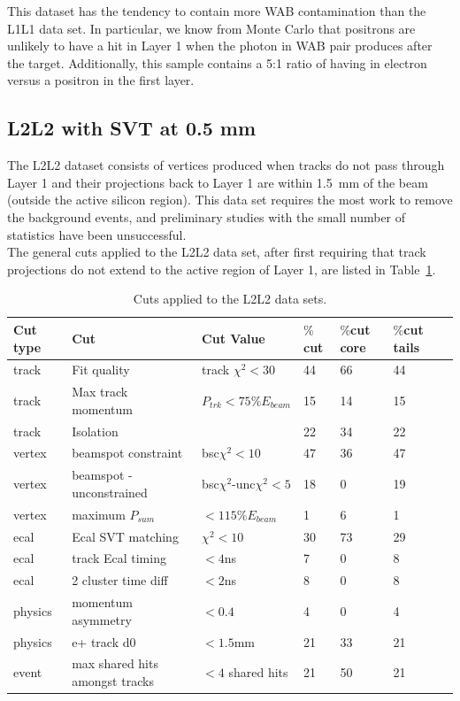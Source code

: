 This dataset has the tendency to contain more WAB contamination than the L1L1 data set. In particular, we know from Monte Carlo that positrons are unlikely to have a hit in Layer 1 when the photon in WAB pair produces after the target. Additionally, this sample contains a 5:1 ratio of having in electron versus a positron in the first layer. 

\subsection{L2L2 with SVT at 0.5 mm}

The L2L2 dataset consists of vertices produced when tracks do not pass through Layer 1 and their projections back to Layer 1 are within 1.5~mm of the beam (outside the active silicon region). This data set requires the most work to remove the background events, and preliminary studies with the small number of statistics have been unsuccessful. \\
\indent The general cuts applied to the L2L2 data set, after first requiring that track projections do not extend to the active region of Layer 1, are listed in Table~\ref{l2l2_cuts}.

\begin{table}[H]
\caption{Cuts applied to the L2L2 data sets.}
\label{l2l2_cuts}
\centering
\begin{tabular}{lllllll}
\toprule
Cut type & Cut & Cut Value &  $\%$cut &  $\%$cut core & $\%$cut tails\\
\midrule
track & Fit quality & track $\chi^{2}<30$ & 44 & 66 & 44 \\
track & Max track momentum &  $P_{trk}<75\%E_{beam}$ & 15 & 14 & 15 \\
track & Isolation &   & 22 & 34 & 22 \\
vertex & beamspot constraint & bsc$\chi^{2}<10$  & 47 & 36 & 47 \\
vertex & beamspot - unconstrained & bsc$\chi^{2}$-unc$\chi^2<5$  & 18 & 0 & 19 \\
vertex & maximum $P_{sum}$ &  $<115\%E_{beam}$ & 1 & 6 & 1 \\
ecal & Ecal SVT matching & $\chi^2<10$  & 30 & 73 & 29 \\
ecal & track Ecal timing & $<4$ns  & 7 & 0 & 8 \\
ecal & 2 cluster time diff & $<2$ns  & 8 & 0 & 8 \\
physics & momentum asymmetry & $<0.4$  & 4 & 0 & 4 \\
physics & e+ track d0 & $<1.5$mm  & 21 & 33 & 21 \\
event & max shared hits amongst tracks & $<4$ shared hits  & 21 & 50 & 21 \\
\bottomrule
\end{tabular}
\end{table}

